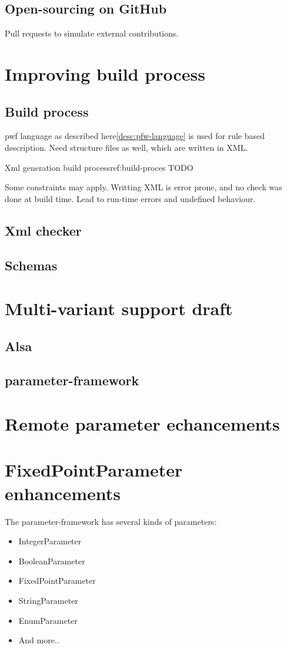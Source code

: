 \subsection{Open-sourcing on GitHub}
Pull requests to simulate external contributions.

\section{Improving build process}
\subsection{Build process}
pwf language as described here\ref{desc:pfw-language} is used for rule based
description. Need structure files as well, which are written in XML.

\begin{figureGraphics}{Xml generation build process}{ref:build-proces}
    TODO
\end{figureGraphics}

Some constraints may apply. Writting XML is error prone, and no check was done at
build time. Lead to run-time errors and undefined behaviour.
\subsection{Xml checker}
\subsection{Schemas}

\section{Multi-variant support draft}
\subsection{Alsa}
\subsection{parameter-framework}

\section{Remote parameter echancements}

\section{FixedPointParameter enhancements}
The parameter-framework has several kinds of parameters:
\begin{itemize}
    \item IntegerParameter
    \item BooleanParameter
    \item FixedPointParameter
    \item StringParameter
    \item EnumParameter
    \item And more..
\end{itemize}

